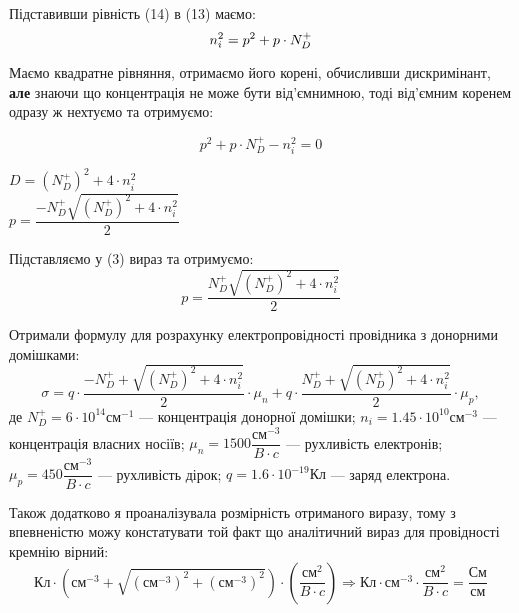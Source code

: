 \documentclass[a4paper,12pt]{article}
\begin{document}
Підставивши рівність (14) в (13) маємо:
\begin{equation}
 n_i^2 = p^2 + p\cdot N_D^+\\
\label{eq:ref}
\end{equation}

Маємо квадратне рівняння, отримаємо його корені, обчисливши дискримінант, \textbf{але} знаючи що концентрація не може бути від'ємнимною, тоді від'ємним коренем одразу ж нехтуємо та отримуємо:\par
 
 \begin{equation}
 p^2 + p\cdot N_D^+ - n_i^2 = 0
\label{eq:ref}
\end{equation}
\begin{center}
$D = (N_D^+)^2 + 4\cdot n_i^2$\\
\vspace{0.3cm}
$p = \dfrac {-N_D^+ \sqrt{(N_D^+)^2 + 4\cdot n_i^2}}{2}$
\end{center}

Підставляємо у (3) вираз та отримуємо:\\
\begin{equation}
p = \dfrac {N_D^+ \sqrt{(N_D^+)^2 + 4\cdot n_i^2}}{2}
 \end{equation}
 
 Отримали формулу для розрахунку електропровідності провідника з донорними домішками:\\
 \begin{equation}
\sigma =  q\cdot \dfrac {-N_D^+ +\sqrt{(N_D^+)^2 + 4\cdot n_i^2}}{2} \cdot \mu_n + q\cdot \dfrac {N_D^+ +\sqrt{(N_D^+)^2 + 4\cdot n_i^2}}{2} \cdot \mu_p,
 \end{equation}
 де $N_D^+ = 6\cdot 10^{14}\text{$\text{см}^{-1}$}$ --- концентрація донорної домішки; 
 $n_i = 1.45\cdot 10^{10}\text{$\text{см}^{-3}$}$ --- концентрація власних носіїв; 
 $\mu_n = 1500 \dfrac{\text{$\text{см}^{-3}$}}{B\cdot c}$ --- рухливість електронів; 
 $\mu_p = 450\dfrac{\text{$\text{см}^{-3}$}}{B\cdot c}$ --- рухливість дірок; 
 $q=1.6\cdot10^{-19} \text{Кл}$ --- заряд електрона. 
 \vspace{1cm}

Також додатково я проаналізувала розмірність отриманого виразу, тому з впевненістю можу констатувати той факт що аналітичний вираз для провідності кремнію вірний:
 \begin{equation}
 \text{Кл} \cdot \left( \text{см$^{-3}$} + \sqrt{(\text{см$^{-3}$})^2 + (\text{см$^{-3}$})^2}\right) \cdot \left(\dfrac{\text{см$^2$}}{B\cdot c}\right)\Rightarrow
 \text{Кл} \cdot \text{см$^{-3}$}\cdot \dfrac{\text{см$^2$}}{B\cdot c} = \dfrac{ \text{См}} {\text{см}}
 \end{equation}
\end{document}
